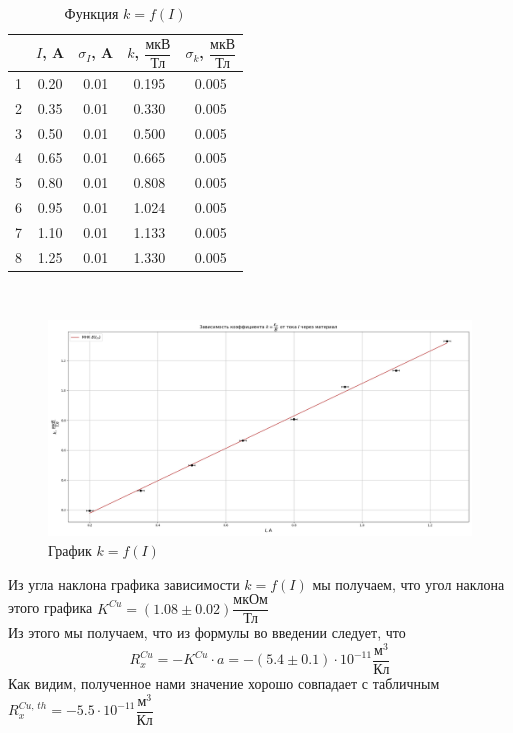 \documentclass[a4paper,12pt]{article}
\theoremstyle{definition}
\begin{document}
    \begin{table}[H]
      \centering
      \caption{Функция $k = f(I)$}
      \label{tabular:med}
        \begin{tabular}{|c|c|c|c|c|} \hline
          & $I$, A & $\sigma_{I}$, A & $k$, $\dfrac{\text{мкВ}}{\text{Тл}}$ & $\sigma_k$, $\dfrac{\text{мкВ}}{\text{Тл}}$ \\ \hline
        1 & 0.20 & 0.01 & 0.195 & 0.005 \\ \hline
        2 & 0.35 & 0.01 & 0.330 & 0.005 \\ \hline
        3 & 0.50 & 0.01 & 0.500 & 0.005 \\ \hline
        4 & 0.65 & 0.01 & 0.665 & 0.005 \\ \hline
        5 & 0.80 & 0.01 & 0.808 & 0.005 \\ \hline
        6 & 0.95 & 0.01 & 1.024 & 0.005 \\ \hline
        7 & 1.10 & 0.01 & 1.133 & 0.005 \\ \hline
        8 & 1.25 & 0.01 & 1.330 & 0.005 \\ \hline
        \end{tabular}\\
    \end{table}

    \begin{figure}[h]
      \centering
        \includegraphics[scale=0.38]{graph-ki.png}
      \caption{График $k = f(I)$}
    \end{figure}

    Из угла наклона графика зависимости $k = f(I)$ мы получаем, что угол наклона этого графика $K^{Cu} = (1.08 \pm 0.02) \dfrac{\text{мкОм}}{\text{Тл}}$\\
    Из этого мы получаем, что из формулы во введении следует, что 
    $$R_x^{Cu} = -K^{Cu} \cdot a = -(5.4 \pm 0.1) \cdot 10^{-11} \dfrac{\text{м}^3}{\text{Кл}}$$
    Как видим, полученное нами значение хорошо совпадает с табличным $ R_x^{Cu,\,th} = -5.5 \cdot 10^{-11} \dfrac{\text{м}^3}{\text{Кл}}$
\end{document}
